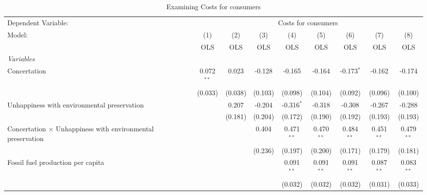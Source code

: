 
\begin{table}[htbp]
   \caption{Examining Costs for consumers}
   \centering
   \begin{tabular}{lcccccccc}
      \toprule
      Dependent Variable: & \multicolumn{8}{c}{Costs for consumers}\\
      Model:                                                             & (1)          & (2)     & (3)     & (4)          & (5)          & (6)          & (7)          & (8)\\  
                                                                         &  OLS         & OLS     & OLS     & OLS          & OLS          & OLS          & OLS          & OLS\\  
      \midrule
      \emph{Variables}\\
      Concertation                                                       & 0.072$^{**}$ & 0.023   & -0.128  & -0.165       & -0.164       & -0.173$^{*}$ & -0.162       & -0.174\\   
                                                                         & (0.033)      & (0.038) & (0.103) & (0.098)      & (0.104)      & (0.092)      & (0.096)      & (0.100)\\   
      Unhappiness with environmental preservation                        &              & 0.207   & -0.204  & -0.316$^{*}$ & -0.318       & -0.308       & -0.267       & -0.288\\   
                                                                         &              & (0.181) & (0.204) & (0.172)      & (0.190)      & (0.192)      & (0.193)      & (0.193)\\   
      Concertation $\times$ Unhappiness with environmental preservation  &              &         & 0.404   & 0.471$^{**}$ & 0.470$^{**}$ & 0.484$^{**}$ & 0.451$^{**}$ & 0.479$^{**}$\\   
                                                                         &              &         & (0.236) & (0.197)      & (0.200)      & (0.171)      & (0.179)      & (0.181)\\   
      Fossil fuel production per capita                                  &              &         &         & 0.091$^{**}$ & 0.091$^{**}$ & 0.091$^{**}$ & 0.087$^{**}$ & 0.083$^{**}$\\   
                                                                         &              &         &         & (0.032)      & (0.032)      & (0.032)      & (0.031)      & (0.033)\\   

\end{tabular}
\end{table}
